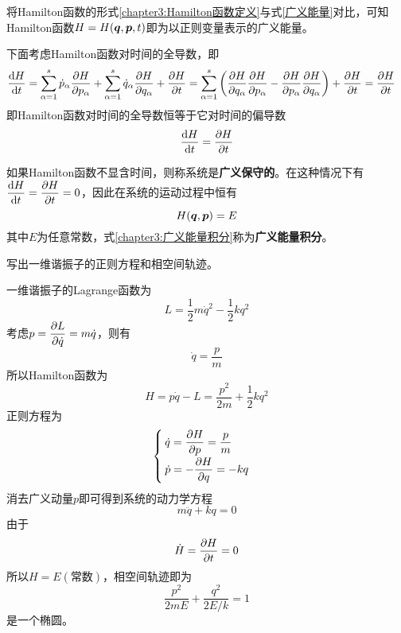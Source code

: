 将Hamilton函数的形式\eqref{chapter3:Hamilton函数定义}与式\eqref{广义能量}对比，可知Hamilton函数$H = H(\boldsymbol{q},\boldsymbol{p},t)$即为以正则变量表示的广义能量。

下面考虑Hamilton函数对时间的全导数，即
\begin{align*}
	\frac{\mathrm{d} H}{\mathrm{d} t} & = \sum_{\alpha=1}^s \dot{p}_\alpha\frac{\partial H}{\partial p_\alpha} + \sum_{\alpha=1}^s \dot{q}_\alpha\frac{\partial H}{\partial q_\alpha} + \frac{\partial H}{\partial t} = \sum_{\alpha=1}^s \left(\frac{\partial H}{\partial q_\alpha}\frac{\partial H}{\partial p_\alpha} - \frac{\partial H}{\partial p_\alpha}\frac{\partial H}{\partial q_\alpha}\right) + \frac{\partial H}{\partial t} = \frac{\partial H}{\partial t}
\end{align*}
即Hamilton函数对时间的全导数恒等于它对时间的偏导数
\begin{equation}
	\frac{\mathrm{d} H}{\mathrm{d} t} = \frac{\partial H}{\partial t}
\end{equation}

如果Hamilton函数不显含时间，则称系统是{\bf 广义保守的}。在这种情况下有$\displaystyle \frac{\mathrm{d} H}{\mathrm{d} t} = \frac{\partial H}{\partial t} = 0$，因此在系统的运动过程中恒有
\begin{equation}
	H(\boldsymbol{q},\boldsymbol{p}) = E
	\label{chapter3:广义能量积分}
\end{equation}
其中$E$为任意常数，式\eqref{chapter3:广义能量积分}称为{\bf 广义能量积分}。

\begin{example}[一维谐振子]
写出一维谐振子的正则方程和相空间轨迹。
\end{example}
\begin{solution}
一维谐振子的Lagrange函数为
\begin{equation*}
	L = \frac12 m\dot{q}^2 - \frac12 kq^2
\end{equation*}
考虑$p = \dfrac{\partial L}{\partial \dot{q}} = m\dot{q}$，则有
\begin{equation*}
	\dot{q} = \frac{p}{m}
\end{equation*}
所以Hamilton函数为
\begin{equation*}
	H = p\dot{q} - L = \frac{p^2}{2m} + \frac12 kq^2
\end{equation*}
正则方程为
\begin{equation*}
	\begin{cases}
		\dot{q} = \dfrac{\partial H}{\partial p} = \dfrac{p}{m} \\[1.5ex]
		\dot{p} = -\dfrac{\partial H}{\partial q} = -kq
	\end{cases}
\end{equation*}
消去广义动量$p$即可得到系统的动力学方程
\begin{equation*}
	m\ddot{q} + kq = 0
\end{equation*}
由于
\begin{equation*}
	\dot{H} = \frac{\partial H}{\partial t} = 0
\end{equation*}
所以$H = E(\text{常数})$，相空间轨迹即为
\begin{equation*}
	\frac{p^2}{2mE} + \frac{q^2}{2E/k} = 1
\end{equation*}
是一个椭圆。
\end{solution}

